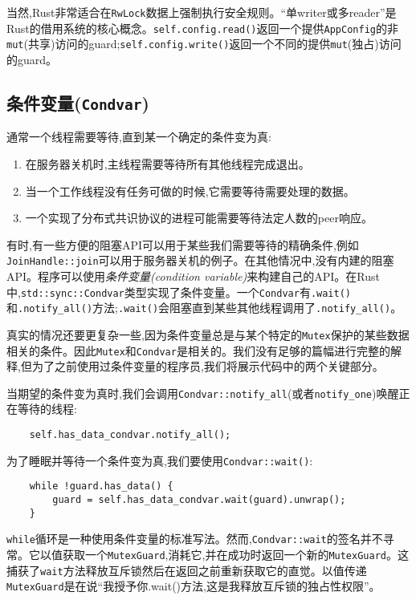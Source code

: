 当然,Rust非常适合在\texttt{RwLock}数据上强制执行安全规则。“单writer或多reader”是Rust的借用系统的核心概念。\texttt{self.config.read()}返回一个提供\texttt{AppConfig}的非\texttt{mut}(共享)访问的guard;\texttt{self.config.write()}返回一个不同的提供\texttt{mut}(独占)访问的guard。

\subsection{条件变量(\texttt{Condvar})}
通常一个线程需要等待,直到某一个确定的条件变为真:
\begin{enumerate}
    \item 在服务器关机时,主线程需要等待所有其他线程完成退出。
    \item 当一个工作线程没有任务可做的时候,它需要等待需要处理的数据。
    \item 一个实现了分布式共识协议的进程可能需要等待法定人数的peer响应。
\end{enumerate}

有时,有一些方便的阻塞API可以用于某些我们需要等待的精确条件,例如\texttt{JoinHandle::join}可以用于服务器关机的例子。在其他情况中,没有内建的阻塞API。程序可以使用\emph{条件变量(condition variable)}来构建自己的API。在Rust中,\texttt{std::sync::Condvar}类型实现了条件变量。一个\texttt{Condvar}有\texttt{.wait()}和\texttt{.notify\_all()}方法;\texttt{.wait()}会阻塞直到某些其他线程调用了\texttt{.notify\_all()}。

真实的情况还要更复杂一些,因为条件变量总是与某个特定的\texttt{Mutex}保护的某些数据相关的条件。因此\texttt{Mutex}和\texttt{Condvar}是相关的。我们没有足够的篇幅进行完整的解释,但为了之前使用过条件变量的程序员,我们将展示代码中的两个关键部分。

当期望的条件变为真时,我们会调用\texttt{Condvar::notify\_all}(或者\texttt{notify\_one})唤醒正在等待的线程:
\begin{verbatim}
    self.has_data_condvar.notify_all();
\end{verbatim}

为了睡眠并等待一个条件变为真,我们要使用\texttt{Condvar::wait()}:
\begin{verbatim}
    while !guard.has_data() {
        guard = self.has_data_condvar.wait(guard).unwrap();
    }
\end{verbatim}

\texttt{while}循环是一种使用条件变量的标准写法。然而,\texttt{Condvar::wait}的签名并不寻常。它以值获取一个\texttt{MutexGuard},消耗它,并在成功时返回一个新的\texttt{MutexGuard}。这捕获了\texttt{wait}方法释放互斥锁然后在返回之前重新获取它的直觉。以值传递\texttt{MutexGuard}是在说“我授予你.wait()方法,这是我释放互斥锁的独占性权限”。

